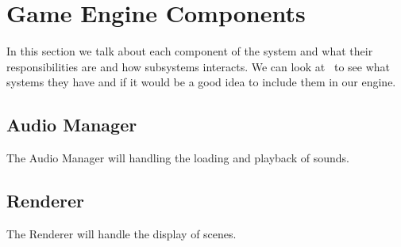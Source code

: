 

\section{Game Engine Components}

In this section we talk about each component of the system and what their responsibilities are and how subsystems interacts.  We can look at~\cite{B_GEA} to see what systems they have and if it would be a good idea to include them in our engine.

\subsection{Audio Manager}

The Audio Manager will handling the loading and playback of sounds.

\subsection{Renderer}

The Renderer will handle the display of scenes.
